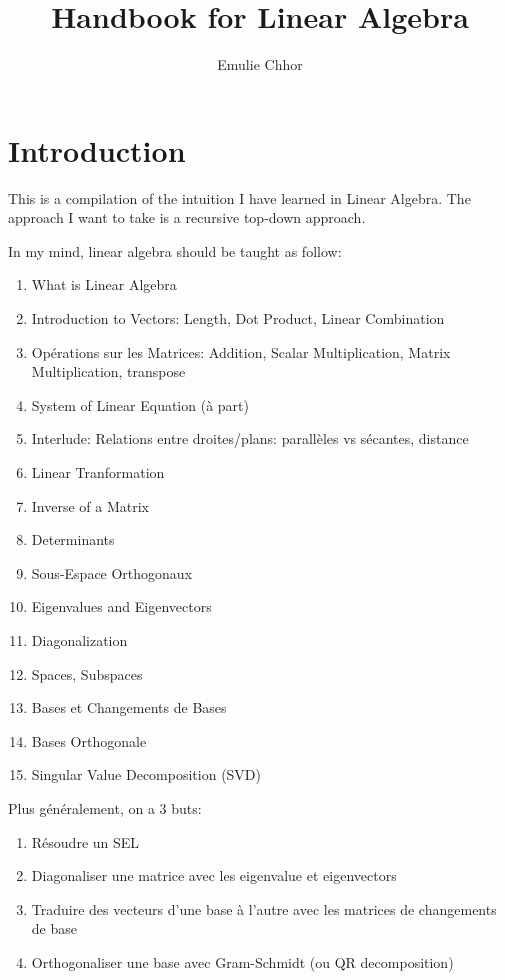 \documentclass{article}
\begin{document}
\title{Handbook for Linear Algebra}
\author{Emulie Chhor}
\maketitle

\section*{Introduction}

This is a compilation of the intuition I have learned in Linear Algebra.
The approach I want to take is a recursive top-down approach.

In my mind, linear algebra should be taught as follow:

\begin{enumerate}
    \item What is Linear Algebra
    \item Introduction to Vectors: Length, Dot Product, Linear Combination
    \item Opérations sur les Matrices: Addition, Scalar Multiplication,
	Matrix Multiplication, transpose
    \item System of Linear Equation (à part)
    \item Interlude: Relations entre droites/plans: parallèles vs sécantes,
	distance
    \item Linear Tranformation
    \item Inverse of a Matrix
    \item Determinants
    \item Sous-Espace Orthogonaux
    \item Eigenvalues and Eigenvectors
    \item Diagonalization
    \item Spaces, Subspaces
    \item Bases et Changements de Bases
    \item Bases Orthogonale
    \item Singular Value Decomposition (SVD)
\end{enumerate}

Plus généralement, on a 3 buts:
\begin{enumerate}
    \item Résoudre un SEL
    \item Diagonaliser une matrice avec les eigenvalue et eigenvectors
    \item Traduire des vecteurs d'une base à l'autre avec les matrices de
	changements de base
    \item Orthogonaliser une base avec Gram-Schmidt (ou QR decomposition)
\end{enumerate}
\end{document}
